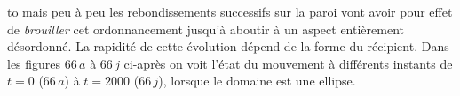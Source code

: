 \midinsert
\vbox to 
\endinsert
\noindent mais peu \`a peu les rebondissements successifs sur la
paroi vont avoir pour effet de {\it brouiller} cet ordonnancement
jusqu'\`a aboutir \`a un aspect enti\`erement d\'esordonn\'e. La 
rapidit\'e
de cette \'evolution d\'epend de la forme du r\'ecipient.
Dans les figures $66\, a$ \`a $66\, j$ ci-apr\`es on voit l'\'etat du
mouvement \`a diff\'erents instants de $t=0$ ($66\, a$) \`a $t=2000$ 
($66\, j$),
lorsque le domaine est une ellipse. \medskip

